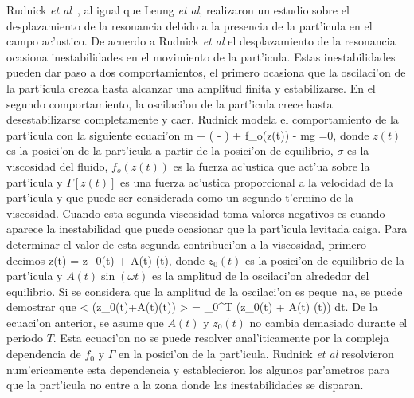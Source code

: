 Rudnick {\it et al}~\cite{rudnick90}, al igual que Leung {\it et al}, realizaron un estudio sobre el desplazamiento
de la resonancia debido a la presencia de la part'icula en el campo ac'ustico.  De acuerdo a Rudnick {\it et al} el
desplazamiento de la resonancia ocasiona inestabilidades en el movimiento de la part'icula. Estas inestabilidades pueden
dar paso a dos comportamientos, el primero ocasiona que la oscilaci'on de la part'icula crezca hasta alcanzar una
amplitud finita y estabilizarse. En el segundo comportamiento, la oscilaci'on de la part'icula crece hasta desestabilizarse
completamente y caer. Rudnick modela el comportamiento de la part'icula con la siguiente ecuaci'on
\BE
m  + \left( \sigma - \Gamma [z(t)] \right)  
+ f_o(z(t)) - mg =0,
\EE
donde $z(t)$ es la posici'on de la part'icula a partir de la posici'on de equilibrio, $\sigma$ es la viscosidad del
fluido, $f_o(z(t))$ es la fuerza ac'ustica que act'ua sobre la part'icula y $\Gamma [z(t)]$ es una fuerza ac'ustica
proporcional a la velocidad de la part'icula y que puede ser considerada como un segundo t'ermino de la viscosidad.
Cuando esta segunda viscosidad toma valores negativos es cuando aparece la inestabilidad que puede ocasionar
que la part'icula levitada caiga. Para determinar el valor de esta segunda contribuci'on a la viscosidad, primero
decimos
\BE
z(t) = z_0(t) + A(t) \sin (\omega t),
\EE
donde $z_0(t)$ es la posici'on de equilibrio de la part'icula y $A(t)\sin (\omega t)$ es la amplitud de
la oscilaci'on alrededor del equilibrio. Si se considera que la amplitud de la oscilaci'on es
peque~na, se puede demostrar que
\BE
< \Gamma(z_0(t)+A(t)\sin (\omega t)) > =  \int_0^T \Gamma (z_0(t) + A(t) \sin (\omega t)) dt.
\EE
De la ecuaci'on anterior, se asume que $A(t)$ y $z_0(t)$ no cambia demasiado durante el periodo $T$. Esta ecuaci'on
no se puede resolver anal'iticamente por la compleja dependencia de $f_0$ y $\Gamma$ en la posici'on de la 
part'icula. Rudnick {\it et al} resolvieron num'ericamente esta dependencia y establecieron los algunos
par'ametros para que la part'icula no entre a la zona donde las inestabilidades se disparan.  

